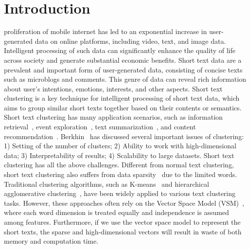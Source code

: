\section{Introduction} \label{sec:introduction}

 proliferation of mobile internet has led to an exponential increase in user-generated data on online platforms, including video, text, and image data. Intelligent processing of such data can significantly enhance the quality of life across society and generate substantial economic benefits. Short text data are a prevalent and important form of user-generated data, consisting of concise texts such as microblogs and comments. This genre of data can reveal rich information about user’s intentions, emotions, interests, and other aspects. Short text clustering is a key technique for intelligent processing of short text data, which aims to group similar short texts together based on their contents or semantics. Short text clustering has many application scenarios, such as information retrieval~\cite{carpineto2012consensus}, event exploration~\cite{feng2015streamcube}, text summarization~\cite{shou2013sumblr}, and content recommendation~\cite{pazzani2007content}. 
Berkhin~\cite{Clustering2006survey} has discussed several important issues of clustering: 1) Setting of the number of clusters; 2) Ability to work with high-dimensional data; 3) Interpretability of results; 4) Scalability to large datasets. Short text clustering has all the above challenges. Different from normal text clustering, short text clustering also suffers from data sparsity~\cite{ZhaiTextmining2012} due to the limited words. 
Traditional clustering algorithms, such as K-means~\cite{dhillon2001concept} and hierarchical agglomerative clustering~\cite{mullner2011modern}, have been widely applied to various text clustering tasks. However, these approaches often rely on the Vector Space Model (VSM)~\cite{salton1975VSM}, where each word dimension is treated equally and independence is assumed among features. Furthermore, if we use the vector space model to represent the short texts, the sparse and high-dimensional vectors will result in waste of both memory and computation time.

